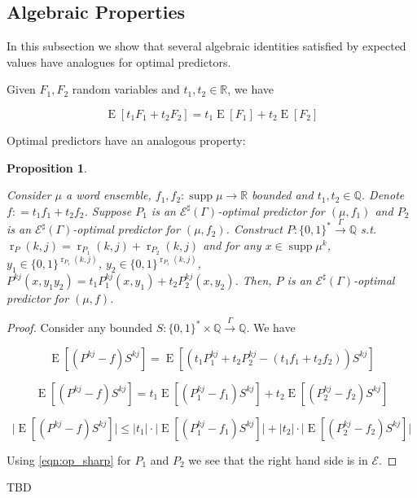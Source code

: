 \documentclass{article}
\numberwithin{equation}{section}
\theoremstyle{definition}
\theoremstyle{plain}
\newtheorem{proposition}{Proposition}[section]
\newcommand{\Bool}{\{0,1\}}
\newcommand{\Words}{{\Bool^*}}
\newcommand{\WordsLen}[1]{{\Bool^{#1}}}
\DeclareMathOperator{\Supp}{supp}
\DeclareMathOperator{\E}{E}
\DeclareMathOperator{\R}{r}
\newcommand{\Rats}{\mathbb{Q}}
\newcommand{\Reals}{\mathbb{R}}
\newcommand{\Abs}[1]{\lvert #1 \rvert}
\newcommand{\Fall}{\mathcal{E}}
\newcommand{\Scheme}{\xrightarrow{\Gamma}}
\begin{document}
\subsection{Algebraic Properties}

In this subsection we show that several algebraic identities satisfied by expected values have analogues for optimal predictors.

Given $F_1,F_2$ random variables and $t_1,t_2 \in \Reals$, we have 

\begin{equation}
\E[t_1 F_1 + t_2 F_2] = t_1 \E[F_1] + t_2 \E[F_2]
\end{equation}

Optimal predictors have an analogous property:

\begin{proposition}
\label{prp:linearity}

Consider $\mu$ a word ensemble, $f_1,f_2: \Supp \mu \rightarrow \Reals$ bounded and $t_1,t_2 \in \Rats$. Denote $f: = t_1 f_1 + t_2 f_2$. Suppose $P_1$ is an $\Fall^\sharp(\Gamma)$-optimal predictor for $(\mu,f_1)$ and $P_2$ is an $\Fall^\sharp(\Gamma)$-optimal predictor for $(\mu,f_2)$. Construct $P: \Words \Scheme \Rats$ s.t. $\R_P(k,j) = \R_{P_1}(k,j) + \R_{P_2}(k,j)$ and for any $x \in \Supp \mu^k$, $y_1 \in \WordsLen{\R_{P_1}(k,j)}$, $y_2 \in \WordsLen{\R_{P_1}(k,j)}$, $P^{kj}(x,y_1 y_2)=t_1 P_1^{kj}(x,y_1) + t_2 P_2^{kj}(x, y_2)$. Then, $P$ is an $\Fall^\sharp(\Gamma)$-optimal predictor for $(\mu, f)$.

\end{proposition}

\begin{proof}

Consider any bounded $S: \Words \times \Rats \Scheme \Rats$. We have

$$\E[(P^{kj} - f)S^{kj}] = \E[(t_1 P_1^{kj} + t_2 P_2^{kj} - (t_1 f_1 + t_2 f_2))S^{kj}]$$

$$\E[(P^{kj} - f)S^{kj}] = t_1 \E[(P_1^{kj} - f_1)S^{kj}] + t_2 \E[(P_2^{kj} - f_2)S^{kj}]$$

$$\Abs{\E[(P^{kj} - f)S^{kj}]} \leq \Abs{t_1} \cdot \Abs{\E[(P_1^{kj} - f_1)S^{kj}]} + \Abs{t_2} \cdot \Abs{\E[(P_2^{kj} - f_2)S^{kj}]}$$

Using \ref{eqn:op_sharp} for $P_1$ and $P_2$ we see that the right hand side is in $\Fall$.

\end{proof}

TBD
\end{document}
